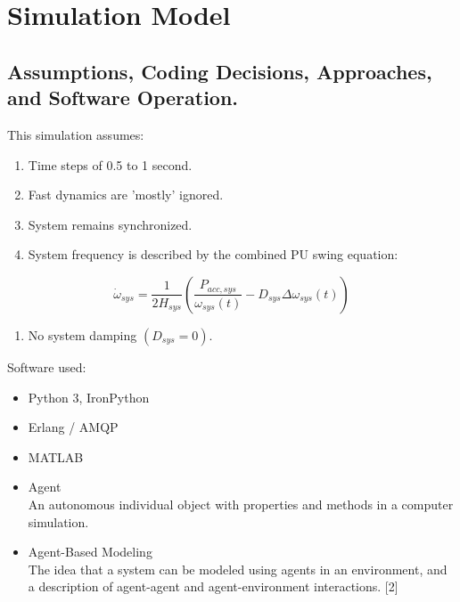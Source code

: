 \documentclass[14pt, unknownkeysallowed]{beamer}
\newcounter{assumptions}
\begin{document}
\section{Simulation Model}
\subsection{Assumptions, Coding Decisions, Approaches, and Software Operation.}
\begin{frame}
This simulation assumes:
\begin{enumerate}
\item Time steps of 0.5 to 1 second.
\item Fast dynamics are 'mostly' ignored.
\item System remains synchronized.
\item System frequency is described by the combined PU swing equation:
\setcounter{assumptions}{\value{enumi}} %
\end{enumerate}
\[ \dot{\omega}_{sys} = \dfrac{1}{2H_{sys} } \left( \dfrac{P_{acc, sys} }{\omega_{sys}(t)} - D_{sys}\Delta\omega_{sys}(t)  \right)\] 
\begin{enumerate}
\setcounter{enumi}{\value{assumptions}}
\item No system damping $(D_{sys} = 0)$.
\end{enumerate}
\end{frame}

\begin{frame}
Software used:
\begin{itemize}
\item Python 3, IronPython
\item Erlang / AMQP
\item MATLAB
\end{itemize}
\end{frame}
\begin{frame}
\begin{itemize}
\item Agent\\ An autonomous individual object with properties and methods in a computer simulation.
\item Agent-Based Modeling\\ The idea that a system can be modeled using agents in an environment, and a description of agent-agent and agent-environment interactions. \tiny[2]
\end{itemize}
\end{frame}
\end{document}

